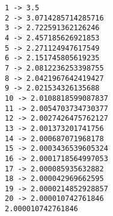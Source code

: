 \begin{verbatim}
1 -> 3.5
2 -> 3.0714285714285716
3 -> 2.722591362126246
4 -> 2.457185626921853
5 -> 2.271124947617549
6 -> 2.151745805619235
7 -> 2.0812236253398755
8 -> 2.0421967642419427
9 -> 2.021534326135688
10 -> 2.0108818599087837
11 -> 2.0054703734730377
12 -> 2.0027426475762127
13 -> 2.001373201741756
14 -> 2.000687071968178
15 -> 2.0003436539605324
16 -> 2.0001718564997053
17 -> 2.000085935632882
18 -> 2.000042969662595
19 -> 2.0000214852928857
20 -> 2.000010742761846
2.000010742761846
\end{verbatim}
